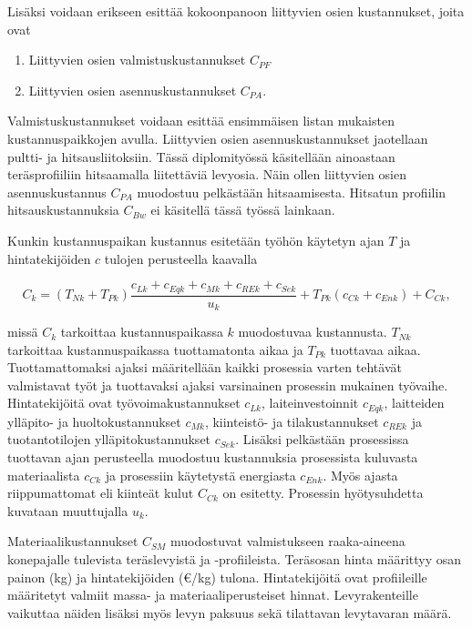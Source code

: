 \documentclass[12pt]{article}
\newenvironment{content}{\pagenumbering{arabic}}{}
\begin{document}
\begin{content}
Lisäksi voidaan erikseen esittää kokoonpanoon liittyvien osien kustannukset, joita ovat 

\begin{enumerate}
\item Liittyvien osien valmistuskustannukset $C_{PF}$
\item Liittyvien osien asennuskustannukset $C_{PA}$.
\end{enumerate}

Valmistuskustannukset voidaan esittää ensimmäisen listan mukaisten kustannuspaikkojen avulla. Liittyvien osien asennuskustannukset jaotellaan pultti- ja hitsausliitoksiin. Tässä diplomityössä käsitellään ainoastaan teräsprofiiliin hitsaamalla liitettäviä levyosia. Näin ollen liittyvien osien asennuskustannus  $C_{PA}$ muodostuu pelkästään hitsaamisesta. Hitsatun profiilin hitsauskustannuksia $C_{Bw}$ ei käsitellä tässä työssä lainkaan. 

Kunkin kustannuspaikan kustannus esitetään työhön käytetyn ajan $T$ ja hintatekijöiden $c$ tulojen perusteella kaavalla

\begin{equation}
\label{kustannuspaikka}
C_k = (T_{Nk} + T_{Pk}) \frac{c_{Lk} + c_{Eqk} + c_{Mk} + c_{REk} + c_{Sek}}{u_k} + T_{Pk} (c_{Ck} + c_{Enk})+C_{Ck},
\end{equation}  

missä $C_k$ tarkoittaa kustannuspaikassa $k$ muodostuvaa kustannusta. $T_{Nk}$ tarkoittaa kustannuspaikassa tuottamatonta aikaa ja $T_{Pk}$ tuottavaa aikaa. Tuottamattomaksi ajaksi määritellään kaikki prosessia varten tehtävät valmistavat työt ja tuottavaksi ajaksi varsinainen prosessin mukainen työvaihe. Hintatekijöitä ovat työvoimakustannukset $c_{Lk}$, laiteinvestoinnit $c_{Eqk}$, laitteiden ylläpito- ja huoltokustannukset $c_{Mk}$, kiinteistö- ja tilakustannukset $c_{REk}$ ja tuotantotilojen ylläpitokustannukset $c_{Sek}$. Lisäksi pelkästään prosessissa tuottavan ajan perusteella muodostuu kustannuksia prosessista kuluvasta materiaalista $c_{Ck}$ ja prosessiin käytetystä energiasta $c_{Enk}$. Myös ajasta riippumattomat eli kiinteät kulut $C_{Ck}$ on esitetty. Prosessin hyötysuhdetta kuvataan muuttujalla $u_k$. \parencite{haapio_doct}

Materiaalikustannukset $C_{SM}$ muodostuvat valmistukseen raaka-aineena konepajalle tulevista teräslevyistä ja -profiileista. Teräsosan hinta määrittyy osan painon (kg) ja hintatekijöiden (\euro{}/kg) tulona. Hintatekijöitä ovat profiileille määritetyt valmiit massa- ja materiaaliperusteiset hinnat. Levyrakenteille vaikuttaa näiden lisäksi myös levyn paksuus sekä tilattavan levytavaran määrä.


\end{content}
\end{document}
